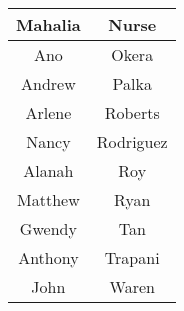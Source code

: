 \documentclass[12pt,dvipsnames]{article}
\begin{document}
\begin{table}
\begin{tabular}{|c|c|}
\hline
Mahalia & Nurse\\ 
\hline
Ano  & Okera\\ 
\hline
Andrew  & Palka\\ 
\hline
Arlene & Roberts\\ 
\hline
Nancy & Rodriguez\\ 
\hline
Alanah & Roy\\ 
\hline
Matthew  & Ryan\\ 
\hline
Gwendy & Tan\\ 
\hline
Anthony  & Trapani\\ 
\hline
John & Waren\\ 
 		\hline\end{tabular}
 \hfill

 
 \end{table}
 
 
\end{document}

